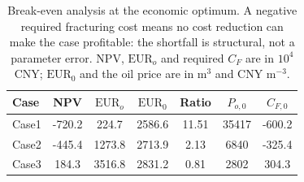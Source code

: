 \begin{table}[htbp]
\centering
\scriptsize
\setlength{\tabcolsep}{3pt}
\caption{Break-even analysis at the economic optimum. A negative required fracturing cost means no cost reduction can make the case profitable: the shortfall is structural, not a parameter error. $\mathrm{NPV}$, $\mathrm{EUR}_{o}$ and required $C_{F}$ are in $10^4$ CNY; $\mathrm{EUR}_0$ and the oil price are in m$^3$ and CNY m$^{-3}$.}
\label{tab:bep}
\begin{tabular}{@{}lcccccc@{}}
\toprule
Case & NPV & $\mathrm{EUR}_{o}$ & $\mathrm{EUR}_0$ & Ratio & $P_{o,0}$ & $C_{F,0}$ \\
\midrule
Case1 & -720.2 & 224.7 & 2586.6 & 11.51 & 35417 & -600.2 \\
Case2 & -445.4 & 1273.8 & 2713.9 & 2.13 & 6840 & -325.4 \\
Case3 & 184.3 & 3516.8 & 2831.2 & 0.81 & 2802 & 304.3 \\
\bottomrule
\end{tabular}
\end{table}
